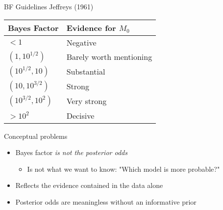 \begin{frame}{BF Guidelines}
Jeffreys (1961)
	\begin{center}
    	\begin{tabular}{ | l | l |}
    		\hline
    		\textbf{Bayes Factor} & \textbf{Evidence for $M_0$} \\ \hline
    		$< 1$ & Negative \\
    		$(1,10^{1/2})$ & Barely worth mentioning \\
    		$(10^{1/2},10)$ & Substantial \\
    		$(10,10^{3/2})$ & Strong \\
    		$(10^{3/2},10^{2})$ & Very strong \\
    		$> 10^2$ & Decisive \\ \hline
    \end{tabular}
	\end{center}
\end{frame}

\begin{frame}{Conceptual problems}
	\begin{itemize}
		\item Bayes factor \emph{is not the posterior odds}
		\begin{itemize}
			\item Is not what we want to know: "Which model is more probable?"
		\end{itemize}
		\item Reflects the evidence contained in the data alone
		\item Posterior odds are meaningless without an informative prior
	\end{itemize}
\end{frame}
